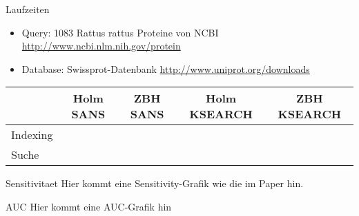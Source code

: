 \documentclass[xcolor=dvipsnames, aspectratio=1610]{beamer}
\begin{document}
\begin{frame}{Laufzeiten}
  \begin{itemize}
    \item Query: 1083 Rattus rattus Proteine von NCBI \tiny{\url{http://www.ncbi.nlm.nih.gov/protein}}
    \item \normalsize{Database: Swissprot-Datenbank} \tiny{\url{http://www.uniprot.org/downloads}}
  \end{itemize}
  \begin{tabular}{l|cccc}
    & Holm SANS & ZBH SANS & Holm KSEARCH & ZBH KSEARCH \\
    \hline
    Indexing & & & & \\
       Suche & & & & \\
  \end{tabular}
\end{frame}

\begin{frame}{Sensitivitaet}
  Hier kommt eine Sensitivity-Grafik wie die im Paper hin.
\end{frame}

\begin{frame}{AUC}
  Hier kommt eine AUC-Grafik hin
\end{frame}
\end{document}
